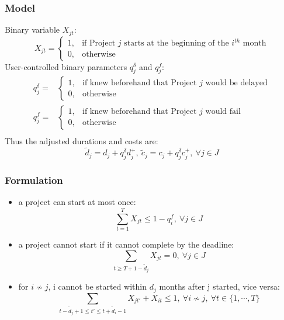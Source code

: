 \documentclass{beamer}
\begin{document}
		\begin{frame}
			\frametitle{Model}
			Binary variable $X_{jt}$:
			\begin{equation*}
				X_{jt}=
				\begin{cases}
					1, & \text{if Project } j \text{ starts at the beginning of the } i^{th} \text{ month} \\
					0, & \text{otherwise}
				\end{cases}
			\end{equation*}
			User-controlled binary parameters $q^{\delta}_j$ and $q^f_j$:
			\begin{equation*}
				\begin{array}{cl}
					q^{\delta}_j= &
					\begin{cases}
						1, & \text{if knew beforehand that Project } j \text{ would be delayed} \\
						0, & \text{otherwise}
					\end{cases}\\
					q^{f}_j= &
					\begin{cases}
						1, & \text{if knew beforehand that Project } j \text{ would fail} \\
						0, & \text{otherwise}
					\end{cases}\\
				\end{array}
			\end{equation*}
			Thus the adjusted durations and costs are:
			\begin{equation*}
				\tilde{d}_j=d_j+q^{\delta}_j d^+_j
				,~
				\tilde{c}_j=c_j+q^{\delta}_j c^+_j
				,~\forall j \in J
			\end{equation*}
		\end{frame}
		
		\begin{frame}
			\frametitle{Formulation}
			\begin{itemize}
				\item a project can start at most once:
					\begin{equation*}
						\sum\limits_{t=1}^{T} X_{jt} \leq 1-q^f_i,~\forall j \in J
					\end{equation*}
				\item a project cannot start if it cannot complete by the deadline:
					\begin{equation*}
						\sum\limits_{t\geq T+1-\tilde{d}_j} X_{jt}=0,~\forall j \in J
					\end{equation*}
				\item for $i \nsim j$, i cannot be started within $d_j$ months after j started, vice versa:
					\begin{equation*}
						\sum\limits_{t-\tilde{d}_j+1\leq t'\leq t+\tilde{d}_i-1} X_{jt'} + X_{it} \leq 1,~\forall i \nsim j,~\forall t \in \{1,\cdots,T\}
					\end{equation*}
			\end{itemize}
		\end{frame}
		
\end{document}
